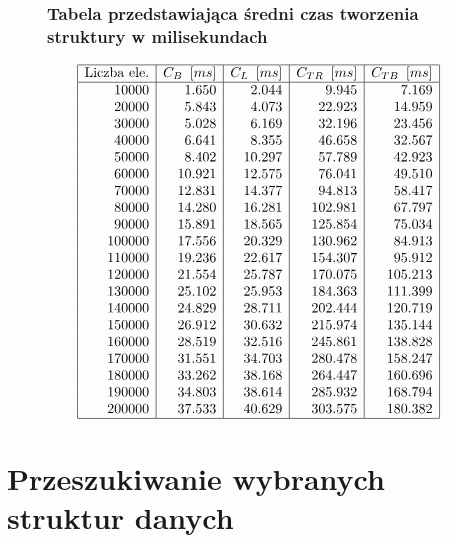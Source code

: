 \documentclass[polish,polish,a4paper]{article}
\begin{document}
\begin{spacing}{1.5}
\begin{figure}[H]
		\subsubsection*{Tabela przedstawiająca średni czas tworzenia struktury w milisekundach}
		\centering
		\begin{equation*}
		\begin{array}{|r|r|r|r|r|}
		\hline
		\multicolumn{1}{|c|}{$Liczba ele.$}&\multicolumn{1}{c|}{C_{B}\enskip[ms]}&\multicolumn{1}{c|}{C_{L}\enskip[ms]}&\multicolumn{1}{c|}{C_{TR}\enskip[ms]}&\multicolumn{1}{c|}{C_{TB}\enskip[ms]}\\ \hline
		10000&1.650&2.044&9.945&7.169\\
		20000&5.843&4.073&22.923&14.959\\
		30000&5.028&6.169&32.196&23.456\\
		40000&6.641&8.355&46.658&32.567\\
		50000&8.402&10.297&57.789&42.923\\
		60000&10.921&12.575&76.041&49.510\\
		70000&12.831&14.377&94.813&58.417\\
		80000&14.280&16.281&102.981&67.797\\
		90000&15.891&18.565&125.854&75.034\\
		100000&17.556&20.329&130.962&84.913\\
		110000&19.236&22.617&154.307&95.912\\
		120000&21.554&25.787&170.075&105.213\\
		130000&25.102&25.953&184.363&111.399\\
		140000&24.829&28.711&202.444&120.719\\
		150000&26.912&30.632&215.974&135.144\\
		160000&28.519&32.516&245.861&138.828\\
		170000&31.551&34.703&280.478&158.247\\
		180000&33.262&38.168&264.447&160.696\\
		190000&34.803&38.614&285.932&168.794\\
		200000&37.533&40.629&303.575&180.382\\\hline		
		\end{array}
		\end{equation*}
\end{figure}
	

\section{Przeszukiwanie wybranych struktur danych}	


\end{spacing}
\end{document}
